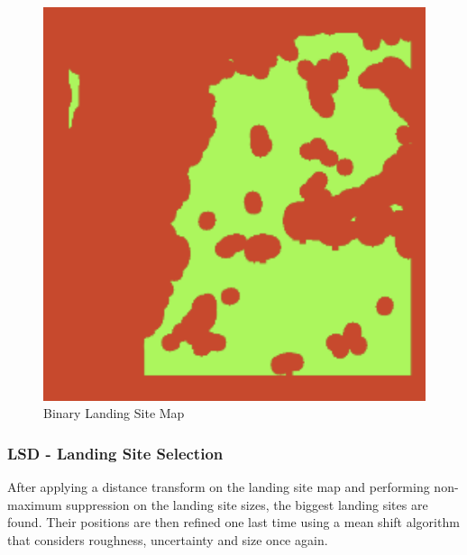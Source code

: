 \begin{figure}[ht!]
    \centering
    \includegraphics[scale=0.5]{images/setup/ls_map.png}
    \caption{Binary Landing Site Map}
    \label{fig:ls_map}
\end{figure}

\subsubsection{LSD - Landing Site Selection}\label{subsubsec:setup:ls_select}

After applying a distance transform on the landing site map and performing non-maximum suppression on the landing site sizes, the biggest landing sites are found. Their positions are then refined one last time using a mean shift algorithm that considers roughness, uncertainty and size once again. 

